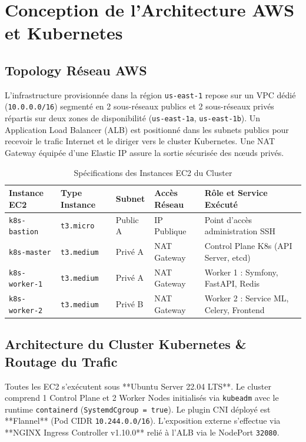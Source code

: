 \documentclass[12pt,a4paper]{report}
\begin{document}
\chapter{Conception de l'Architecture AWS et Kubernetes}

\section{Topology Réseau AWS}
L'infrastructure provisionnée dans la région \texttt{us-east-1} repose sur un VPC dédié (\texttt{10.0.0.0/16}) segmenté en 2 sous-réseaux publics et 2 sous-réseaux privés répartis sur deux zones de disponibilité (\texttt{us-east-1a}, \texttt{us-east-1b}). Un Application Load Balancer (ALB) est positionné dans les subnets publics pour recevoir le trafic Internet et le diriger vers le cluster Kubernetes. Une NAT Gateway équipée d'une Elastic IP assure la sortie sécurisée des nœuds privés.

\begin{table}[H]
\centering
\caption{Spécifications des Instances EC2 du Cluster}
\label{tab:ec2}
\begin{tabularx}{\textwidth}{llllX}
\toprule
\textbf{Instance EC2} & \textbf{Type Instance} & \textbf{Subnet} & \textbf{Accès Réseau} & \textbf{Rôle et Service Exécuté} \\
\midrule
\texttt{k8s-bastion} & \texttt{t3.micro} & Public A & IP Publique & Point d'accès administration SSH \\
\texttt{k8s-master} & \texttt{t3.medium} & Privé A & NAT Gateway & Control Plane K8s (API Server, etcd) \\
\texttt{k8s-worker-1} & \texttt{t3.medium} & Privé A & NAT Gateway & Worker 1 : Symfony, FastAPI, Redis \\
\texttt{k8s-worker-2} & \texttt{t3.medium} & Privé B & NAT Gateway & Worker 2 : Service ML, Celery, Frontend \\
\bottomrule
\end{tabularx}
\end{table}

\section{Architecture du Cluster Kubernetes \& Routage du Trafic}
Toutes les EC2 s'exécutent sous **Ubuntu Server 22.04 LTS**. Le cluster comprend 1 Control Plane et 2 Worker Nodes initialisés via \texttt{kubeadm} avec le runtime \texttt{containerd} (\texttt{SystemdCgroup = true}). Le plugin CNI déployé est **Flannel** (Pod CIDR \texttt{10.244.0.0/16}). L'exposition externe s'effectue via **NGINX Ingress Controller v1.10.0** relié à l'ALB via le NodePort \texttt{32080}.
\end{document}
